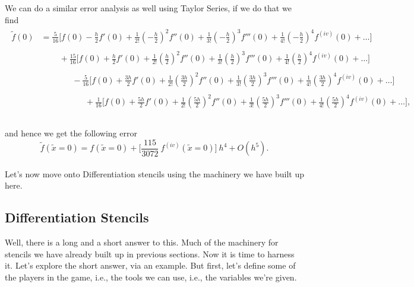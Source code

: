 \documentclass[paper=a4, fontsize=11pt]{scrartcl} %
\numberwithin{equation}{section} %
\numberwithin{figure}{section} %
\numberwithin{table}{section} %
\begin{document}
We can do a similar error analysis as well using Taylor Series, if we do that we find \\

\begin{align}
\nonumber
\begin{split}
\tilde{f}(0) &= \frac{5}{16}  \Big[ f(0) - \frac{h}{2} f'(0) + \frac{1}{2!} \left(- \frac{h}{2}\right)^2 f''(0) +  \frac{1}{3!} \left(- \frac{h}{2}\right)^3 f'''(0) +  \frac{1}{4!} \left(- \frac{h}{2}\right)^4 f^{(iv)}(0)+\ldots \Big] \\ \\
 &\ \ \ \ \ \ \ \ \ \ +  \frac{15}{16}  \Big[ f(0) + \frac{h}{2} f'(0) + \frac{1}{2!} \left( \frac{h}{2}\right)^2 f''(0) +  \frac{1}{3!} \left( \frac{h}{2}\right)^3 f'''(0) +  \frac{1}{4!} \left( \frac{h}{2}\right)^4 f^{(iv)}(0)+\ldots \Big] \\ \\
  &\ \ \ \ \ \ \ \ \ \  \ \ \ \ \ \ \ -  \frac{5}{16}  \Big[ f(0) + \frac{3h}{2} f'(0) + \frac{1}{2!} \left( \frac{3h}{2}\right)^2 f''(0) +  \frac{1}{3!} \left( \frac{3h}{2}\right)^3 f'''(0) +  \frac{1}{4!} \left( \frac{3h}{2}\right)^4 f^{(iv)}(0)+\ldots \Big] \\ \\
&\ \ \ \ \ \ \ \ \ \ \ \ \ \ \ \ \  \ \ \ \ \ \ \ + \frac{1}{16}  \Big[ f(0) + \frac{5h}{2} f'(0) + \frac{1}{2!} \left( \frac{5h}{2}\right)^2 f''(0) +  \frac{1}{3!} \left( \frac{5h}{2}\right)^3 f'''(0) +  \frac{1}{4!} \left( \frac{5h}{2}\right)^4 f^{(iv)}(0)+\ldots \Big],\\ 
\end{split}
\end{align}\\

and hence we get the following error\\

$$\tilde{f}(\tilde{x}=0) = f(\tilde{x}=0) + \Big[\frac{115}{3072}\ f^{(iv)}(\tilde{x}=0)\Big]\ h^4 + O(h^5).$$\\

Let's now move onto Differentiation stencils using the machinery we have built up here. \\

\subsection{Differentiation Stencils}

$ $\\

Well, there is a long and a short answer to this. Much of the machinery for stencils we have already built up in previous sections. Now it is time to harness it. Let's explore the short answer, via an example. But first, let's define some of the players in the game, i.e., the tools we can use, i.e., the variables we're given.\\
\end{document}
